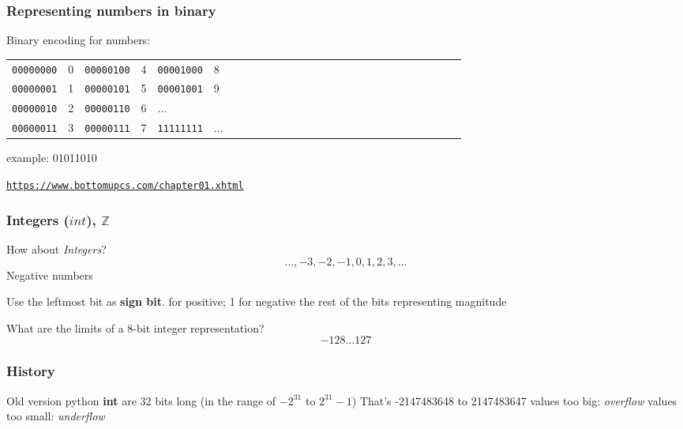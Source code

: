 \documentclass[11pt]{beamer}
\begin{document}
\begin{frame}
  \frametitle{Representing numbers in binary}
  \Enlarge

  \begin{itemize}
  \myitem  Binary encoding for numbers:
    \begin{tabular}{*{27}{l}}
      \texttt{00000000} & 0 & \texttt{00000100} & 4 & \texttt{00001000} & 8\\
      \texttt{00000001} & 1 & \texttt{00000101} & 5 & \texttt{00001001} & 9\\
      \texttt{00000010} & 2 & \texttt{00000110} & 6 & ... & \\
      \texttt{00000011} & 3 & \texttt{00000111} & 7 & \texttt{11111111} & ...\\
    \end{tabular}\pause
  
  \myitem example: 01011010
  \end{itemize} \pause
  
  
  \hspace{7mm} \textcolor{blue}{\small \texttt{\url{https://www.bottomupcs.com/chapter01.xhtml}}} 
  
\end{frame}

\begin{frame}
  \frametitle{Integers ($int$), $\mathbb{Z}$}
  \Enlarge

  \begin{itemize}
  \myitem  How about \emph{Integers}? \\ 
  $$ ..., -3, -2, -1, 0, 1, 2, 3, ... $$\vspace{-2mm}  \pause
  \myitem Negative numbers  \pause
  	\begin{itemize}
		\mysubitem Use the leftmost bit as \textbf{sign bit}. \pause
		 for positive; 1 for negative\pause
		\mysubitem the rest of the bits representing magnitude\pause
	\end{itemize}
  \myitem What are the limits of a 8-bit integer representation?\\ \pause
    $$ -128 ... 127 $$
  \end{itemize}
\end{frame}

\begin{frame}
  \frametitle{History}
  \Enlarge

  \begin{itemize}
  \myitem Old version python {\bf int} are 32 bits long (in the range of $-2^{31}$ to $2^{31}-1$) 
  \myitem That's -2147483648 to 2147483647
  \myitem values too big: \emph{overflow}
  \myitem values too small: \emph{underflow}
  \end{itemize}
\end{frame}
\end{document}
